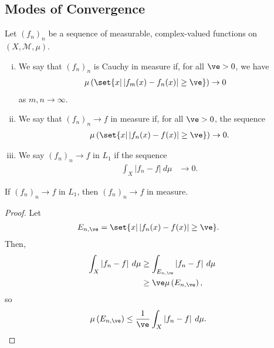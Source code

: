 \documentclass[10pt]{mypackage}
\begin{document}
\subsection{Modes of Convergence}%
\begin{definition}
  Let $\left( f_n \right)_n$ be a sequence of measurable, complex-valued functions on $\left( X,\mathcal{M},\mu \right)$. 
  \begin{enumerate}[(i)]
    \item We say that $\left( f_n \right)_n$ is Cauchy in measure if, for all $\ve > 0$, we have
      \begin{align*}
        \mu\left( \set{x | \left\vert f_m(x)-f_n(x) \right\vert\geq \ve} \right) &\rightarrow 0
      \end{align*}
      as $m,n\rightarrow\infty$.
    \item We say that $\left( f_n \right)_n\rightarrow f$ in measure if, for all $\ve > 0$, the sequence
      \begin{align*}
        \mu\left( \set{x | \left\vert f_n(x)-f(x) \right\vert \geq \ve} \right) \rightarrow 0.
      \end{align*}
    \item We say $\left( f_n \right)_n\rightarrow f$ in $L_1$ if the sequence
      \begin{align*}
        \int_{X}^{} \left\vert f_n-f \right\vert\:d\mu &\rightarrow 0.
      \end{align*}
  \end{enumerate}
\end{definition}
\begin{proposition}
  If $\left( f_n \right)_n\rightarrow f$ in $L_1$, then $\left( f_n \right)_n\rightarrow f$ in measure.
\end{proposition}
\begin{proof}
  Let
  \begin{align*}
    E_{n,\ve} &= \set{x | \left\vert f_n(x) - f(x) \right\vert \geq \ve}.
  \end{align*}
  Then,
  \begin{align*}
    \int_{X}^{} \left\vert f_n-f \right\vert\:d\mu &\geq \int_{E_{n,\ve}}^{} \left\vert f_n-f \right\vert\:d\mu\\
                                                   &\geq \ve \mu\left( E_{n,\ve} \right),
  \end{align*}
  so
  \begin{align*}
    \mu\left( E_{n,\ve} \right) &\leq \frac{1}{\ve} \int_{X}^{} \left\vert f_n-f \right\vert\:d\mu.
  \end{align*}
\end{proof}
\end{document}
